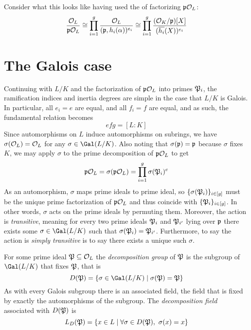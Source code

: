 Consider what this looks like having used the  of factorizing $\mathfrak{p}\mathcal{O}_L$:
\begin{equation}
    \frac{\mathcal{O}_L}{\mathfrak{p}\mathcal{O}_L}
    \cong \prod_{i=1}^g \frac{\mathcal{O}_L}{(\mathfrak{p},h_i(\alpha))^{e_i}}
    \cong \prod_{i=1}^g \frac{(\mathcal{O}_K/\mathfrak{p})[X]}{(\overline{h_i}(X))^{e_i}}
\end{equation}


\section{The Galois case}

Continuing with $L/K$ and the factorization of $\mathfrak{p}\mathcal{O}_L$ into primes $\mathfrak{P}_i$, the ramification indices and inertia degrees are simple in the case that $L/K$ is Galois.
In particular, all $e_i=e$ are equal, and all $f_i=f$ are equal, and as such, the fundamental relation becomes
\begin{equation}
    efg = [L:K]
\end{equation}
Since automorphisms on $L$ induce automorphisms on subrings, we have $\sigma(\mathcal{O}_L)=\mathcal{O}_L$ for any $\sigma\in\Gal(L/K)$.
Also noting that $\sigma(\mathfrak{p})=\mathfrak{p}$ because $\sigma$ fixes $K$, we may apply $\sigma$ to the prime decomposition of $\mathfrak{p}\mathcal{O}_L$ to get
\begin{equation}
    \mathfrak{p}\mathcal{O}_L = \sigma(\mathfrak{p}\mathcal{O}_L) = \prod_{i=1}^g \sigma(\mathfrak{P}_i)^e
\end{equation}
As an automorphism, $\sigma$ maps prime ideals to prime ideal, so $\{\sigma(\mathfrak{P}_i)\}_{i\in[g]}$ must be the unique prime factorization of $\mathfrak{p}\mathcal{O}_L$ and thus coincide with $\{\mathfrak{P}_i\}_{i\in[g]}$.
In other words, $\sigma$ acts on the prime ideals by permuting them.
Moreover, the action is \emph{transitive}, meaning for every two prime ideals $\mathfrak{P}_i$ and $\mathfrak{P}_{i'}$ lying over $\mathfrak{p}$ there exists some $\sigma\in\Gal(L/K)$ such that $\sigma(\mathfrak{P}_i)=\mathfrak{P}_{i'}$.
Furthermore, to say the action is \emph{simply transitive} is to say there exists a unique such $\sigma$.

For some prime ideal $\mathfrak{P}\subseteq\mathcal{O}_L$ the \emph{decomposition group} of $\mathfrak{P}$ is the subgroup of $\Gal(L/K)$ that fixes $\mathfrak{P}$, that is
\begin{equation}
    D(\i{P}) = \{\sigma\in\Gal(L/K)\mid\sigma(\i{P})=\i{P}\}
\end{equation}
As with every Galois subgroup there is an associated field, the field that is fixed by exactly the automorphisms of the subgroup.
The \emph{decomposition field} associated with $D(\mathfrak{P})$ is
\begin{equation}
    L_D(\mathfrak{P}) = \{x\in L\mid\forall\sigma\in D(\mathfrak{P}),\ \sigma(x)=x\}
\end{equation}

